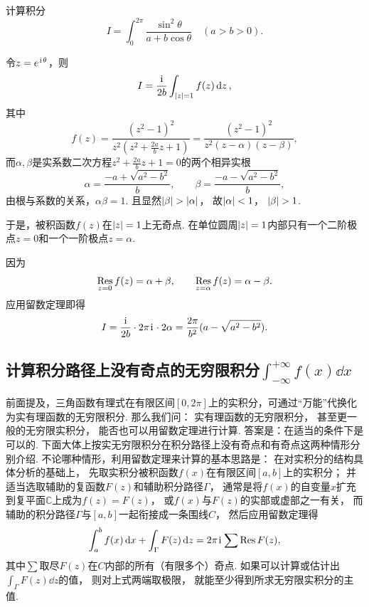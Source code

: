 \begin{example}
计算积分\begin{equation*}
	I = \int_0^{2\pi} \frac{\sin^2 \theta}{a+b\cos\theta} \quad(a>b>0).
\end{equation*}
\begin{solution}
令\(z=e^{\kern1pt\mathrm{i}\kern1pt\theta}\)，则\begin{equation*}
	I = \frac{\kern1pt\mathrm{i}\kern1pt}{2b} \int_{\abs{z}=1} f(z) \dd{z},
\end{equation*}
其中\begin{equation*}
	f(z) = \frac{(z^2-1)^2}{z^2 \left(z^2+\frac{2a}{b}z+1\right)}
	= \frac{(z^2-1)^2}{z^2(z-\alpha)(z-\beta)},
\end{equation*}
而\(\alpha,\beta\)是实系数二次方程\(z^2+\frac{2a}{b}z+1=0\)的两个相异实根\begin{equation*}
	\alpha=\frac{-a+\sqrt{a^2-b^2}}{b},
	\qquad
	\beta=\frac{-a-\sqrt{a^2-b^2}}{b},
\end{equation*}
由根与系数的关系，\(\alpha\beta=1\).
且显然\(\abs{\beta}>\abs{\alpha}\)，
故\(\abs{\alpha}<1\)，
\(\abs{\beta}>1\).

于是，被积函数\(f(z)\)在\(\abs{z}=1\)上无奇点.
在单位圆周\(\abs{z}=1\)内部只有一个二阶极点\(z=0\)和一个一阶极点\(z=\alpha\).

因为\begin{equation*}
	\operatorname*{Res}_{z=0} f(z) = \alpha+\beta,
	\qquad
	\operatorname*{Res}_{z=\alpha} f(z) = \alpha-\beta.
\end{equation*}
应用留数定理即得\begin{equation*}
	I = \frac{\kern1pt\mathrm{i}\kern1pt}{2b} \cdot 2\pi\kern1pt\mathrm{i}\kern1pt \cdot 2\alpha
	= \frac{2\pi}{b^2} (a-\sqrt{a^2-b^2}).
\end{equation*}
\end{solution}
\end{example}

\subsection{计算积分路径上没有奇点的无穷限积分\texorpdfstring{\(\int_{-\infty}^{+\infty} f(x) \dd{x}\)}{}}
前面提及，三角函数有理式在有限区间\([0,2\pi]\)上的实积分，可通过“万能”代换化为实有理函数的无穷限积分.
那么我们问：
实有理函数的无穷限积分，
甚至更一般的无穷限实积分，
能否也可以用留数定理进行计算.
答案是：在适当的条件下是可以的.
下面大体上按实无穷限积分在积分路径上没有奇点和有奇点这两种情形分别介绍.
不论哪种情形，利用留数定理来计算的基本思路是：
在对实积分的结构具体分析的基础上，
先取实积分被积函数\(f(x)\)在有限区间\([a,b]\)上的实积分；
并适当选取辅助的复函数\(F(z)\)和辅助积分路径\(\Gamma\)，
通常是将\(f(x)\)的自变量\(x\)扩充到复平面\(\mathbb{C}\)上成为\(f(z)=F(z)\)，
或\(f(x)\)与\(F(z)\)的实部或虚部之一有关，
而辅助的积分路径\(\Gamma\)与\([a,b]\)一起衔接成一条围线\(C\)，
然后应用留数定理得\begin{equation}
	\int_a^b f(x) \dd{x}
	+ \int_\Gamma F(z) \dd{z}
	= 2\pi\kern1pt\mathrm{i}\kern1pt \sum \operatorname*{Res} F(z),
\end{equation}
其中\(\sum\)取尽\(F(z)\)在\(C\)内部的所有（有限多个）奇点.
如果可以计算或估计出\(\int_\Gamma F(z) \dd{z}\)的值，
则对上式两端取极限，
就能至少得到所求无穷限实积分的主值.

